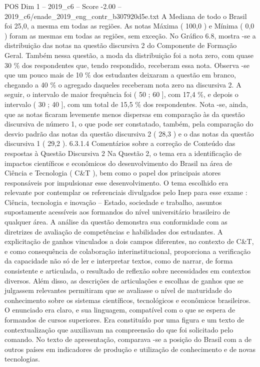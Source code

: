 \begin{textsample}{POS Dim 1 – 2019\_c6 – Score -2.00 – 2019\_c6/enade\_2019\_eng\_contr\_b307920d5e.txt}
A Mediana de todo o Brasil foi 25,0, a mesma em todas as regiões.
As notas Máxima ( 100,0 ) e Mínima ( 0,0 ) foram as mesmas em todas as regiões, sem exceção.
No Gráfico 6.8, mostra -se a distribuição das notas na questão discursiva 2 do Componente de Formação Geral.
Também nessa questão, a moda da distribuição foi a nota zero, com quase 30 \% dos respondentes que, tendo respondido, receberam essa nota.
Observa -se que um pouco mais de 10 \% dos estudantes deixaram a questão em branco, chegando a 40 \% o agregado daqueles receberam nota zero na discursiva 2.
A seguir, o intervalo de maior frequência foi ( 50 ; 60 ], com 17,4 \%, e depois o intervalo ( 30 ; 40 ], com um total de 15,5 \% dos respondentes.
Nota -se, ainda, que as notas ficaram levemente menos dispersas em comparação às da questão discursiva de número 1, o que pode ser constatado, também, pela comparação do desvio padrão das notas da questão discursiva 2 ( 28,3 ) e o das notas da questão discursiva 1 ( 29,2 ). 6.3.1.4 Comentários sobre a correção de Conteúdo das respostas à Questão Discursiva 2 Na Questão 2, o tema era a identificação de impactos científicos e econômicos do desenvolvimento do Brasil na área de Ciência e Tecnologia ( C\&T ), bem como o papel dos principais atores responsáveis por impulsionar esse desenvolvimento.
O tema escolhido era relevante por contemplar os referenciais divulgados pelo Inep para esse exame : Ciência, tecnologia e inovação – Estado, sociedade e trabalho, assuntos supostamente acessíveis aos formandos do nível universitário brasileiro de qualquer área.
A análise da questão demonstra sua conformidade com as diretrizes de avaliação de competências e habilidades dos estudantes.
A explicitação de ganhos vinculados a dois campos diferentes, no contexto de C\&T, e como consequência de colaboração interinstitucional, proporciona a verificação da capacidade não só de ler e interpretar textos, como de narrar, de forma consistente e articulada, o resultado de reflexão sobre necessidades em contextos diversos.
Além disso, as descrições de articulações e escolhas de ganhos que se julgassem relevantes permitiram que se avaliasse o nível de maturidade do conhecimento sobre os sistemas científicos, tecnológicos e econômicos brasileiros.
O enunciado era claro, e sua linguagem, compatível com o que se espera de formandos de cursos superiores.
Era constituído por uma figura e um texto de contextualização que auxiliavam na compreensão do que foi solicitado pelo comando.
No texto de apresentação, comparava -se a posição do Brasil com a de outros países em indicadores de produção e utilização de conhecimento e de novas tecnologias.

\end{textsample}
